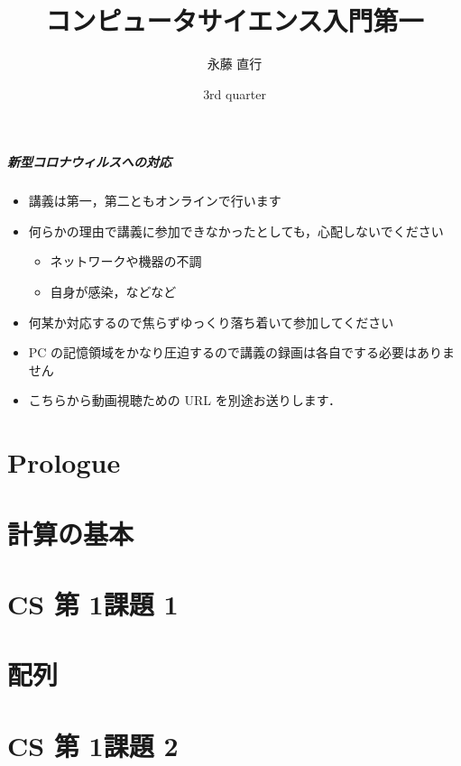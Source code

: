 \documentclass[final,c]{beamer}
\title[elementaryCS-1st]{コンピュータサイエンス入門第一}
\date[3rd quarter]{3rd quarter}
\author[Naoyuki Nagatou]{永藤 直行}
\institute[TITECH]{東京工業大学 情報理工学院}
\begin{document}
\begin{frame}
\frametitle{新型コロナウィルスへの対応}
  \begin{itemize}
\item 講義は第一，第二ともオンラインで行います
\item 何らかの理由で講義に参加できなかったとしても，心配しないでください
    \begin{itemize}
\item ネットワークや機器の不調
\item 自身が感染，などなど
    \end{itemize}
\item 何某か対応するので焦らずゆっくり落ち着いて参加してください
\item PC の記憶領域をかなり圧迫するので講義の録画は各自でする必要はありません
\item こちらから動画視聴ための URL を別途お送りします．
  \end{itemize}
\end{frame}
\frame{\titlepage}
%
%
\part{Prologue}


%
%
\part{計算の基本}

%

\part{CS 第 1\textemdash 課題 1}

%
%
\part{配列}

%
%
\part{CS 第 1\textemdash 課題 2}

%
%
%
%
\end{document}
